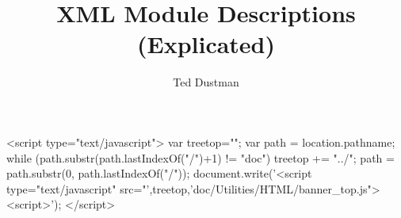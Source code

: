 \documentclass[11pt]{article}
\begin{document}
\begin{rawhtml}
  <script type="text/javascript">
  var treetop="";
  var path = location.pathname;
  while (path.substr(path.lastIndexOf("/")+1) != "doc") {
    treetop += "../";
    path = path.substr(0, path.lastIndexOf("/"));
  }
  document.write('<script type="text/javascript" src="',treetop,'doc/Utilities/HTML/banner_top.js"><\/script>');
  </script>
\end{rawhtml}

\title{XML Module Descriptions (Explicated)}
\author{Ted Dustman}
\maketitle 
\newpage
\tableofcontents
\newpage

\newcommand{\Xml}{\xml}
\newcommand{\psgml}{\acronym{PSGML}}
\newcommand{\Psgml}{\psgml}
\newcommand{\dtd}{\acronym{DTD}}
\newcommand{\Pse}{\pse}
\newcommand{\Sci}{\sci}
\newcommand{\Sr}{\sr}
\newcommand{\cvs}{\acronym{CVS}}
\newcommand{\Cvs}{\cvs}
\newcommand{\emacs}{emacs}
\newcommand{\Emacs}{Emacs}
\newcommand{\sectitle}[1]{\emph{#1}}
\newcommand{\sechyperref}[1]{\hyperref{\sectitle{#1}}{}{}{#1}}
\newcommand{\element}[1]{\ab{\texttt{#1}}}
\newcommand{\attribute}[1]{\texttt{#1}}
\newcommand{\elementitem}[1]{\item[\texttt{\ab{#1}}]}
\newcommand{\psgmlurl}{http://www.lysator.liu.se/projects/about\_psgml.html}
\newcommand{\Note}[1]{\emph{Note: #1}}
\newcommand{\xmlvalidurl}{http://www.stg.brown.edu/service/xmlvalid/}
\newcommand{\ytbd}{\emph{Yet to be done}}
\newcommand{\doctitle}[1]{\textit{#1}}

\newcommand{\SECintro}{Introduction}
\newcommand{\SUBSECwhySpec}{Purpose}
\newcommand{\SUBSECwhyXml}{Why XML?}
\newcommand{\SUBSECwhatDtd}{The DTD}
\newcommand{\SECcontent}{Rules, Structure, and Content}
\newcommand{\SUBSECrules}{Rules}
\newcommand{\SUBSECstructContent}{Structure and Content}
\newcommand{\SUBSECdescElement}{A Description of the \ab{description} Element}
\newcommand{\SUBSUBSECcommonUsage}{Common Usage}
\newcommand{\SUBSUBSECdescElementIntro}{Overview}
\newcommand{\SUBSUBSECreference}{Reference}
\newcommand{\SECexample}{Example}
\newcommand{\SECediting}{Editing the Spec}
\newcommand{\SUBSECgettingSources}{XML Mode - Do You Have It?}
\newcommand{\SUBSECdotEmacs}{XML Mode - .emacs}
\newcommand{\SUBSECgettingStarted}{XML Mode - Getting Started}
\newcommand{\SECvalidation}{Validation}
\end{document}

